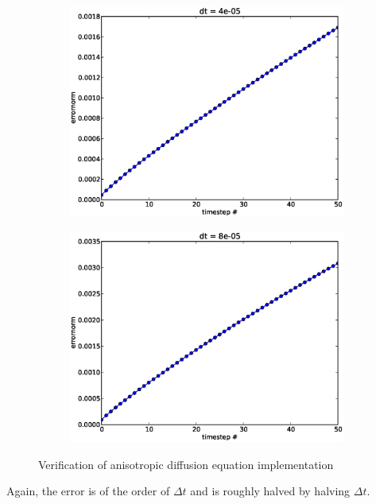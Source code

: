 \begin{figure}[H]
\centering
\begin{subfigure}[b]{0.48\textwidth}
\includegraphics[width=\textwidth]{../doc/results/experiment_05112013_1303/results/deterministic_errorplot.eps}
\caption{}
\label{anisotropic_diffusion_verification:single_dt}
\end{subfigure}
\begin{subfigure}[b]{0.48\textwidth}
\includegraphics[width=\textwidth]{../doc/results/experiment_05112013_1304/results/deterministic_errorplot.eps}
\caption{}
\label{anisotropic_diffusion_verification:double_dt}
\end{subfigure}
\caption[Verification of anisotropic diffusion equation implementation]{Verification of anisotropic diffusion equation implementation}
\label{anisotropic_diffusion_verification}
\end{figure}
Again, the error is of the order of $\Delta t$ and is roughly halved by halving $\Delta t$.

